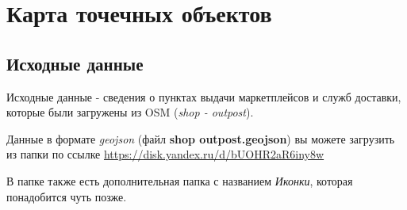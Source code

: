 \documentclass[
  russian,
]{article}
\begin{document}
\section{Карта точечных
объектов}\label{ux43aux430ux440ux442ux430-ux442ux43eux447ux435ux447ux43dux44bux445-ux43eux431ux44aux435ux43aux442ux43eux432}

\subsection{Исходные
данные}\label{ux438ux441ux445ux43eux434ux43dux44bux435-ux434ux430ux43dux43dux44bux435-1}

Исходные данные - сведения о пунктах выдачи маркетплейсов и служб
доставки, которые были загружены из OSM (\emph{shop - outpost}).

Данные в формате \emph{geojson} (файл \textbf{shop outpost.geojson}) вы
можете загрузить из папки по ссылке
\url{https://disk.yandex.ru/d/bUOHR2aR6iny8w}

В папке также есть дополнительная папка с названием \emph{Иконки},
которая понадобится чуть позже.
\end{document}
